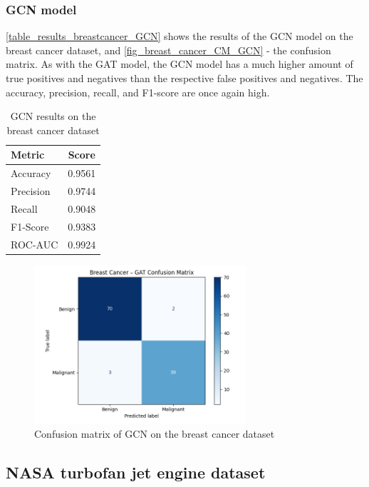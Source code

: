 \documentclass[12pt]{article}
\begin{document}
\subsubsection{GCN model}

\autoref{table_results_breastcancer_GCN} shows the results of the GCN model on the breast cancer dataset, and \autoref{fig_breast_cancer_CM_GCN} - the confusion matrix. As with the GAT model, the GCN model has a much higher amount of true positives and negatives than the respective false positives and negatives. The accuracy, precision, recall, and F1-score are once again high.


\begin{table}[H]
\centering
\caption{GCN results on the breast cancer dataset}
\begin{tabular}{|l|c|}
\hline
\textbf{Metric} & \textbf{Score} \\
\hline
Accuracy  & 0.9561 \\
Precision & 0.9744 \\
Recall    & 0.9048 \\
F1-Score  & 0.9383 \\
ROC-AUC   & 0.9924 \\
\hline
\end{tabular}
\label{table_results_breastcancer_GCN}
\end{table}

\begin{figure}[H]
    \centering
    \includegraphics[width=0.7\textwidth]{figures/BreastCancer_GCN_CM.png}
    \caption{Confusion matrix of GCN on the breast cancer dataset}
    \label{fig_breast_cancer_CM_GCN}
\end{figure}

\subsection{NASA turbofan jet engine dataset}
\end{document}
